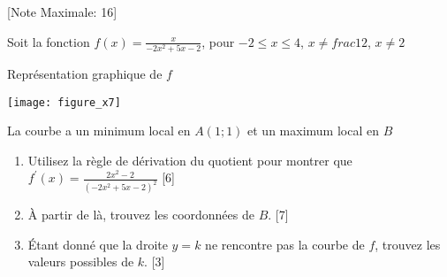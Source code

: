 \begin{question}
  \hspace*{\fill} [Note Maximale: 16]\par
  \medskip
  \noindent Soit la fonction $f(x) =\frac{x}{-2x^2 + 5x - 2}$, pour $-2 \le x \le 4$, $x \ne frac{1}{2}$, $x\ne2$\par
  \medskip
  \begin{center} %
    \noindent Représentation graphique de $f$\par
    \texttt{[image: figure\_x7]}\par
    \noindent La courbe a un minimum local en $A(1;1)$ et un maximum local en $B$\par
  \end{center} %
  \begin{enumerate}[label=(\alph*)]
    \item Utilisez la règle de dérivation du quotient pour montrer que $f^\prime(x)=\frac{2x^2 - 2}{(-2x^2+5x-2)^2}$\hspace*{\fill} [6]
    \item À partir de là, trouvez les coordonnées de $B$.\hspace*{\fill} [7]
    \item Étant donné que la droite $y=k$ ne rencontre pas la courbe de $f$, trouvez les valeurs possibles de $k$.\hspace*{\fill} [3]
  \end{enumerate}
\end{question}
